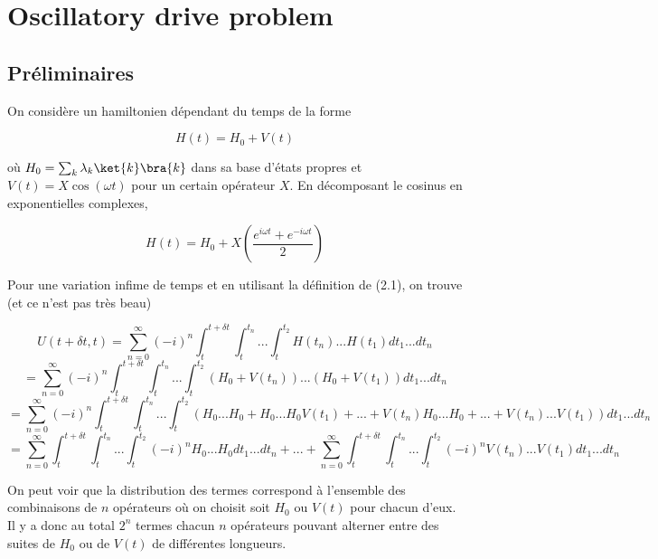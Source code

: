 \section{Oscillatory drive problem}
\subsection{Préliminaires}
On considère un hamiltonien dépendant du temps de la forme 

\begin{equation}
    H(t) = H_0 + V(t)
\end{equation}

où $H_0 = \sum_{k} \lambda_k \ket{k}\bra{k}$ dans sa base d'états propres et $V(t) = X\cos(\omega t)$ pour un certain opérateur $X$. En décomposant le cosinus en exponentielles complexes, 

\begin{equation*}
    H(t) = H_0 + X\left(\frac{e^{i \omega t} + e^{-i\omega t}}{2}\right)
\end{equation*}

Pour une variation infime de temps et en utilisant la définition de (2.1), on trouve (et ce n'est pas très beau)

\begin{equation*}
    U(t+\delta t, t) = \sum_{n=0}^{\infty} (-i)^n \int_{t}^{t+\delta t}\int_{t}^{t_n}...\int_{t}^{t_2}H(t_n)...H(t_1)dt_1 ... dt_n
\end{equation*}
\begin{equation*}
    = \sum_{n=0}^{\infty} (-i)^n \int_{t}^{t+\delta t}\int_{t}^{t_n}...\int_{t}^{t_2}\left(H_0 + 
    V(t_n)\right)...\left(H_0 + V(t_1)\right)dt_1 ... dt_n
\end{equation*}
\begin{equation*}
    = \sum_{n=0}^{\infty} (-i)^n \int_{t}^{t+\delta t}\int_{t}^{t_n}...\int_{t}^{t_2} \left(H_0...H_0 + H_0...H_0V(t_1) + ... + V(t_n)H_0...H_0 + ... + V(t_n)...V(t_1)\right)dt_1 ... dt_n
\end{equation*}
\begin{equation}
    = \sum_{n=0}^{\infty} \int_{t}^{t+\delta t}\int_{t}^{t_n}...\int_{t}^{t_2} (-i)^n H_0...H_0 dt_1...dt_n + ... + \sum_{n=0}^{\infty} \int_{t}^{t+\delta t}\int_{t}^{t_n}...\int_{t}^{t_2}(-i)^n V(t_n)...V(t_1) dt_1...dt_n
\end{equation}

On peut voir que la distribution des termes correspond à l'ensemble des combinaisons de $n$ opérateurs où on choisit soit $H_0$ ou $V(t)$ pour chacun d'eux. Il y a donc au total $2^n$ termes chacun $n$ opérateurs pouvant alterner entre des suites de $H_0$ ou de $V(t)$ de différentes longueurs. 

